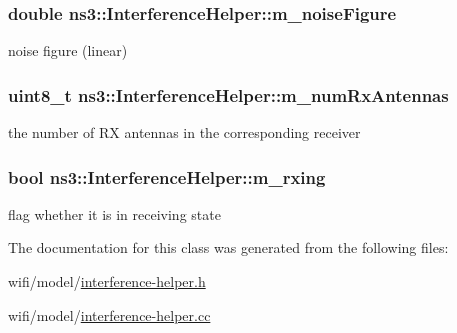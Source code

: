 \subsubsection[{\texorpdfstring{m\+\_\+noise\+Figure}{m_noiseFigure}}]{\setlength{\rightskip}{0pt plus 5cm}double ns3\+::\+Interference\+Helper\+::m\+\_\+noise\+Figure\hspace{0.3cm}{\ttfamily [private]}}\hypertarget{classns3_1_1InterferenceHelper_a2112c6ae475fb8ce5434246237ce1c91}{}\label{classns3_1_1InterferenceHelper_a2112c6ae475fb8ce5434246237ce1c91}
noise figure (linear) 
\subsubsection[{\texorpdfstring{m\+\_\+num\+Rx\+Antennas}{m_numRxAntennas}}]{\setlength{\rightskip}{0pt plus 5cm}uint8\+\_\+t ns3\+::\+Interference\+Helper\+::m\+\_\+num\+Rx\+Antennas\hspace{0.3cm}{\ttfamily [private]}}\hypertarget{classns3_1_1InterferenceHelper_a3c4c246de043decec1d726c10cda34f7}{}\label{classns3_1_1InterferenceHelper_a3c4c246de043decec1d726c10cda34f7}
the number of RX antennas in the corresponding receiver 
\subsubsection[{\texorpdfstring{m\+\_\+rxing}{m_rxing}}]{\setlength{\rightskip}{0pt plus 5cm}bool ns3\+::\+Interference\+Helper\+::m\+\_\+rxing\hspace{0.3cm}{\ttfamily [private]}}\hypertarget{classns3_1_1InterferenceHelper_a27ce49a3e1c7e7c6a178bc62071d89a6}{}\label{classns3_1_1InterferenceHelper_a27ce49a3e1c7e7c6a178bc62071d89a6}
flag whether it is in receiving state 

The documentation for this class was generated from the following files\+:\begin{DoxyCompactItemize}
\item 
wifi/model/\hyperlink{interference-helper_8h}{interference-\/helper.\+h}\item 
wifi/model/\hyperlink{interference-helper_8cc}{interference-\/helper.\+cc}\end{DoxyCompactItemize}
